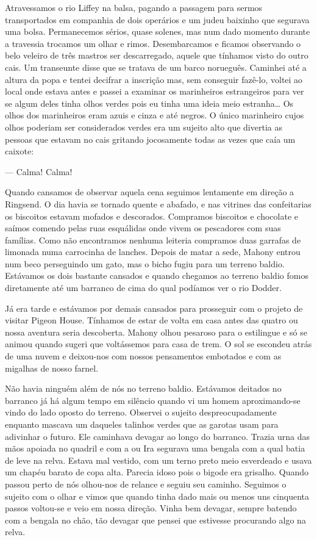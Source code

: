 Atravessamos o rio Liffey na balsa, pagando a passagem para sermos
transportados em companhia de dois operários e um judeu baixinho que
segurava uma bolsa. Permanecemos sérios, quase solenes, mas num dado
momento durante a travessia trocamos um olhar e rimos. Desembarcamos
e ficamos observando o belo veleiro de três mastros ser descarregado,
aquele que tínhamos visto do outro cais. Um transeunte disse que se
tratava de um barco norueguês. Caminhei até a altura da popa e tentei
decifrar a inscrição mas, sem conseguir fazê-lo, voltei ao local onde
estava antes e passei a examinar os marinheiros estrangeiros para ver
se algum deles tinha olhos verdes pois eu tinha uma ideia meio
estranha\ldots{} Os olhos dos marinheiros eram azuis e cinza e até negros.
O único marinheiro cujos olhos poderiam ser considerados verdes era
um sujeito alto que divertia as pessoas que estavam no cais gritando
jocosamente todas as vezes que caía um caixote:

--- Calma! Calma!

Quando cansamos de observar aquela cena seguimos lentamente em
direção a Ringsend. O dia havia se tornado quente e abafado, e nas
vitrines das confeitarias os biscoitos estavam mofados e descorados.
Compramos biscoitos e chocolate e saímos comendo pelas ruas esquálidas
onde vivem os pescadores com suas famílias. Como não encontramos
nenhuma leiteria compramos duas garrafas de limonada numa carrocinha
de lanches. Depois de matar a sede, Mahony entrou num beco perseguindo
um gato, mas o bicho fugiu para um terreno baldio. Estávamos os dois
bastante cansados e quando chegamos ao terreno baldio fomos
diretamente até um barranco de cima do qual podíamos ver o rio Dodder.

Já era tarde e estávamos por demais cansados para prosseguir com o
projeto de visitar Pigeon House. Tínhamos de estar de volta em casa
antes das quatro ou nossa aventura seria descoberta. Mahony olhou
pesaroso para o estilingue e só se animou quando sugeri que
voltássemos para casa de trem. O sol se escondeu atrás de uma nuvem e
deixou-nos com nossos pensamentos embotados e com as migalhas de nosso
farnel.

Não havia ninguém além de nós no terreno baldio. Estávamos deitados no
barranco já há algum tempo em silêncio quando vi um homem
aproximando-se vindo do lado oposto do terreno. Observei o sujeito
despreocupadamente enquanto mascava um daqueles talinhos verdes que as
garotas usam para adivinhar o futuro. Ele caminhava devagar ao longo
do barranco. Trazia urna das mãos apoiada no quadril e com a ou Ira
segurava uma bengala com a qual batia de leve na relva. Estava mal
vestido, com um terno preto meio esverdeado e usava um chapéu barato
de copa alta. Parecia idoso pois o bigode era grisalho. Quando passou
perto de nós olhou-nos de relance e seguiu seu caminho. Seguimos o
sujeito com o olhar e vimos que quando tinha dado mais ou menos uns
cinquenta passos voltou-se e veio em nossa direção. Vinha bem devagar,
sempre batendo com a bengala no chão, tão devagar que pensei que
estivesse procurando algo na relva.

